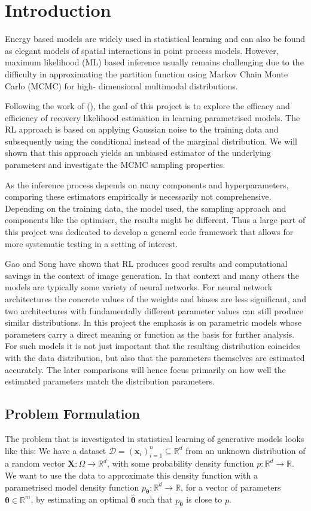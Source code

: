 \section{Introduction}

Energy based models are widely used in statistical learning and can also be found as elegant models of spatial interactions in point process models. 
However, maximum likelihood (ML) based inference usually remains challenging due to the difficulty in approximating the partition function using Markov Chain Monte Carlo (MCMC) for high- dimensional multimodal distributions.

Following the work of (), the goal of this project is to explore the efficacy and efficiency of recovery likelihood estimation in learning parametrised models.
The RL approach is based on applying Gaussian noise to the training data and subsequently using the conditional instead of the marginal distribution.
We will shown that this approach yields an unbiased estimator of the underlying parameters and investigate the MCMC sampling properties. 

As the inference process depends on many components and hyperparameters, comparing these estimators empirically is necessarily not comprehensive.
Depending on the training data, the model used, the sampling approach and components like the optimiser, the results might be different.
Thus a large part of this project was dedicated to develop a general code framework that allows for more systematic testing in a setting of interest.

Gao and Song have shown that RL produces good results and computational savings in the context of image generation.
In that context and many others the models are typically some variety of neural networks.
For neural network architectures the concrete values of the weights and biases are less significant, 
and two architectures with fundamentally different parameter values can still produce similar distributions.
In this project the emphasis is on parametric models whose parameters carry a direct meaning or function as the basis for further analysis.
For such models it is not just important that the resulting distribution coincides with the data distribution, 
but also that the parameters themselves are estimated accurately.
The later comparisons will hence focus primarily on how well the estimated parameters match the distribution parameters.

\subsection{Problem Formulation}
The problem that is investigated in statistical learning of generative models looks like this:
We have a dataset $\mathcal{D} = (\bm{x}_i)_{i = 1}^n \subseteq \mathbb{R}^d$ from an unknown distribution of a random vector $\bm{X} : \Omega \to \mathbb{R}^d$,
with some probability density function $p : \mathbb{R}^d \to \mathbb{R}$.
We want to use the data to approximate this density function with a parametrised model density function $p_{\bm{\theta}}: \mathbb{R}^d \to \mathbb{R}$,
for a vector of parameters $\bm{\theta} \in \mathbb{R}^m$, by estimating an optimal $\hat{\bm{\theta}}$ such that $p_{ \hat{\bm{\theta}} }$ is close to $p$.


